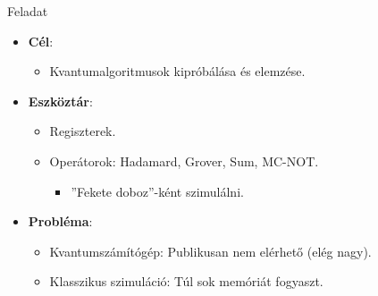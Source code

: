 \documentclass[aspectratio=169]{beamer}
\begin{document}
\begin{frame}[t]{Feladat}

\begin{itemize}
    \item \textbf{Cél}:
    \begin{itemize}
      \item Kvantumalgoritmusok kipróbálása és elemzése.
    \end{itemize}
    \item \textbf{Eszköztár}:
    \begin{itemize}
      \item Regiszterek.
      \item Operátorok: Hadamard, Grover, Sum, MC-NOT.
      \begin{itemize}
        \item ''Fekete doboz''-ként szimulálni.
      \end{itemize}
    \end{itemize}
    \item \textbf{Probléma}:
    \begin{itemize}
      \item Kvantumszámítógép: Publikusan nem elérhető (elég nagy).
      \item Klasszikus szimuláció: Túl sok memóriát fogyaszt.
    \end{itemize}
\end{itemize}
\end{frame}
\end{document}
